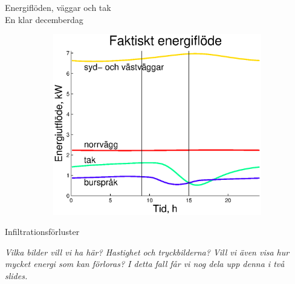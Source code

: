 \begin{frame}{Energiflöden, väggar och tak\\En klar decemberdag}
\begin{figure}
{\begin{subfigure}[b]{0.48\textwidth}
                \includegraphics[width=\textwidth]{images/walls2.eps}
        \end{subfigure}
        }
\end{figure}


\end{frame}



\begin{frame}{Infiltrationsförluster}

\emph{\color{red} Vilka bilder vill vi ha här? Hastighet och tryckbilderna? Vill vi även visa hur mycket energi som kan förloras? I detta fall får vi nog dela upp denna
i två slides.}

\end{frame}
